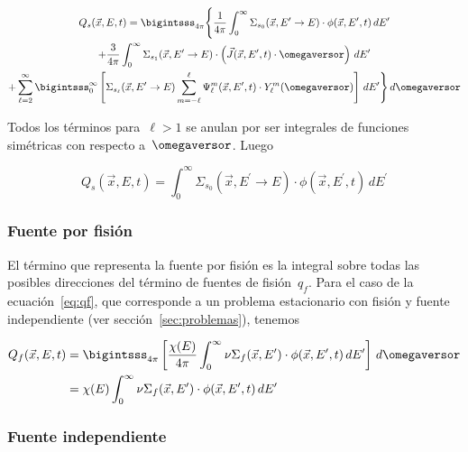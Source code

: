 \begin{multline*}
 Q_s(\vec{x}, E, t) = \bigintsss_{4\pi} \Bigg\{
\frac{1}{4\pi} \int_{0}^{\infty} \Sigma_{s_0}(\vec{x}, E^{\prime} \rightarrow E) \cdot \phi(\vec{x}, E^{\prime}, t) \, dE^\prime \\
+ \frac{3}{4\pi} \int_{0}^{\infty} \Sigma_{s_1}(\vec{x}, E^{\prime} \rightarrow E) \cdot \left(\vec{J}(\vec{x},E^{\prime},t) \cdot \omegaversor\right) \, dE^\prime  \\
+ \sum_{\ell=2}^\infty \bigintsss_{0}^{\infty}   \left[ \Sigma_{s_\ell}(\vec{x}, E^{\prime} \rightarrow E) 
\sum_{m=-\ell}^{\ell} \Psi_\ell^m (\vec{x}, E^{\prime}, t) \cdot Y_\ell^{m}(\omegaversor)  \right] \, dE^{\prime} \Bigg\} \, d\omegaversor
\end{multline*}

Todos los términos para~$\ell>1$ se anulan por ser integrales de funciones simétricas con respecto a~$\omegaversor$. Luego

\begin{equation}\label{eq:Qs}
Q_s(\vec{x}, E, t) = \int_{0}^{\infty} \Sigma_{s_0}(\vec{x}, E^{\prime} \rightarrow E)  \cdot \phi(\vec{x}, E^\prime, t) \, dE^\prime
\end{equation}


\subsubsection{Fuente por fisión} %

El término que representa la fuente por fisión es la integral sobre todas las posibles direcciones del término de fuentes de fisión~$q_f$. Para el caso de la ecuación~\eqref{eq:qf}, que corresponde a un problema estacionario con fisión y fuente independiente (ver sección~\ref{sec:problemas}), tenemos

\begin{align}\label{eq:Qf}
Q_f(\vec{x},E,t) &= \bigintsss_{4\pi} \left[ \frac{\chi(E)}{4\pi} \int_{0}^{\infty} \nu\Sigma_f(\vec{x}, E^\prime) \cdot \phi(\vec{x}, E^\prime, t) \, dE^\prime \right] \, d\omegaversor \nonumber \\
&= \chi(E) \int_{0}^{\infty} \nu\Sigma_f(\vec{x}, E^\prime) \cdot \phi(\vec{x}, E^\prime, t) \, dE^\prime
\end{align}

\subsubsection{Fuente independiente} %


